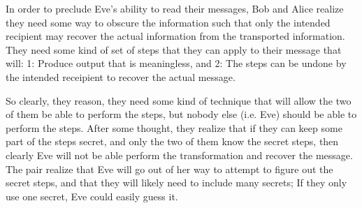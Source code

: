 \documentclass[11pt]{article} %
\begin{document}
In order to preclude Eve's ability to read their messages, Bob and Alice realize they need some way to obscure the information such that only the intended recipient may recover the actual information from the transported information. They need some kind of set of steps that they can apply to their message that will: 1: Produce output that is meaningless, and 2: The steps can be undone by the intended receipient to recover the actual message. 

So clearly, they reason, they need some kind of technique that will allow the two of them be able to perform the steps, but nobody else (i.e. Eve) should be able to perform the steps. After some thought, they realize that if they can keep some part of the steps secret, and only the two of them know the secret steps, then clearly Eve will not be able perform the transformation and recover the message. The pair realize that Eve will go out of her way to attempt to figure out the secret steps, and that they will likely need to include many secrets; If they only use one secret, Eve could easily guess it. 


\end{document}
